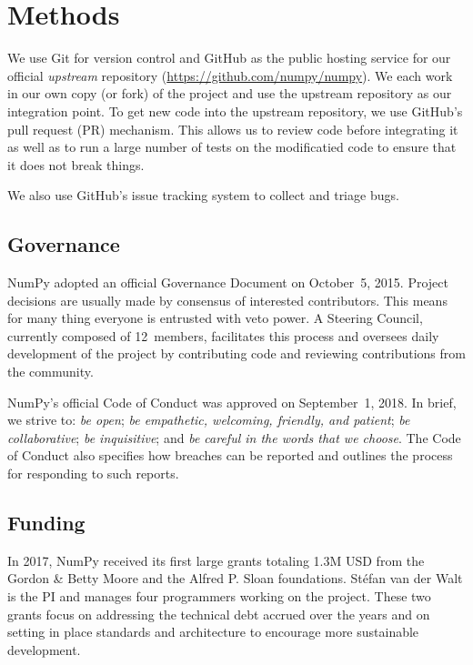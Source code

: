 \section*{Methods}

We use Git for version control and GitHub as the public hosting service for our
official \emph{upstream} repository (\url{https://github.com/numpy/numpy}).
We each work in our own copy (or fork) of the project and use the
upstream repository as our integration point.
To get new code into the upstream repository, we use GitHub's
pull request (PR) mechanism.
This allows us to review code before integrating it as well as to run a
large number of tests on the modificatied code to ensure that it does not
break things.

We also use GitHub's issue tracking system to collect and triage bugs.


\subsection*{Governance}

NumPy adopted an official Governance Document on October~5,
2015\cite{NumPyProjectGovernance}.
Project decisions are usually made by consensus of interested contributors.
This means for many thing everyone is entrusted with veto power.
A Steering Council, currently composed of 12~members, facilitates this
process and oversees daily development of the project by contributing code
and reviewing contributions from the community.

NumPy's official Code of Conduct was approved on September~1, 2018\cite{NumPyCodeofConduct}.
In brief, we strive to:
\emph{be open};
\emph{be empathetic, welcoming, friendly, and patient};
\emph{be collaborative};
\emph{be inquisitive}; and
\emph{be careful in the words that we choose}.
The Code of Conduct also specifies how breaches can be reported and outlines
the process for responding to such reports.

\subsection*{Funding}

In 2017, NumPy received its first large grants totaling 1.3M USD from the
Gordon \& Betty Moore and the Alfred P. Sloan foundations.
Stéfan van der Walt is the PI and manages four programmers working on the project.
These two grants focus on addressing the technical debt accrued over the years and
on setting in place standards and architecture to encourage more sustainable development.

